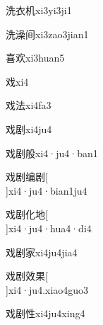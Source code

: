 \begin{verbete}[9;6;6]{洗衣机}{xi3yi3ji1}
\end{verbete}

\begin{verbete}[9;16;7]{洗澡间}{xi3zao3jian1}
\end{verbete}

\begin{verbete}[12;6]{喜欢}{xi3huan5}
\end{verbete}

\begin{verbete}[6]{戏}{xi4}
\end{verbete}

\begin{verbete}[6;8]{戏法}{xi4fa3}
\end{verbete}

\begin{verbete}[6;10]{戏剧}{xi4ju4}
\end{verbete}

\begin{verbete}[6;10;10]{戏剧般}{xi4·ju4·ban1}
\end{verbete}

\begin{verbete}[6;10;12;10]{戏剧编剧}[\\]{xi4·ju4·bian1ju4}
\end{verbete}

\begin{verbete}[6;10;4;6]{戏剧化地}[\\]{xi4·ju4·hua4·di4}
\end{verbete}

\begin{verbete}[6;10;10]{戏剧家}{xi4ju4jia4}
\end{verbete}

\begin{verbete}[6;10;10;8]{戏剧效果}[\\]{xi4·ju4.xiao4guo3}
\end{verbete}

\begin{verbete}[6;10;8]{戏剧性}{xi4ju4xing4}
\end{verbete}

